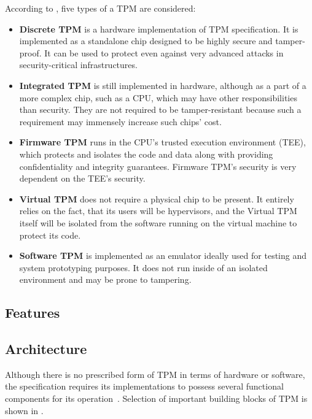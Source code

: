 According to \cite{tcg_tpm2_briefintro}, five types of a TPM are considered:

\begin{itemize}
    \item \textbf{Discrete TPM} is a hardware implementation of TPM specification. It is implemented as a standalone chip designed to be highly secure and tamper-proof. It can be used to protect even against very advanced attacks in security-critical infrastructures.
    \item \textbf{Integrated TPM} is still implemented in hardware, although as a part of a more complex chip, such as a CPU, which may have other responsibilities than security. They are not required to be tamper-resistant because such a requirement may immensely increase such chips' cost.
    \item \textbf{Firmware TPM} runs in the CPU's trusted execution environment (TEE), which protects and isolates the code and data along with providing confidentiality and integrity guarantees. Firmware TPM's security is very dependent on the TEE's security.
    \item \textbf{Virtual TPM} does not require a physical chip to be present. It entirely relies on the fact, that its users will be hypervisors, and the Virtual TPM itself will be isolated from the software running on the virtual machine to protect its code. 
    \item \textbf{Software TPM} is implemented as an emulator ideally used for testing and system prototyping purposes. It does not run inside of an isolated environment and may be prone to tampering.
\end{itemize}

\subsection{Features}




\subsection{Architecture}
Although there is no prescribed form of TPM in terms of hardware or software, the specification requires its implementations to possess several functional components for its operation~\cite{tcg_p1_architecture}. Selection of important building blocks of TPM is shown in .

